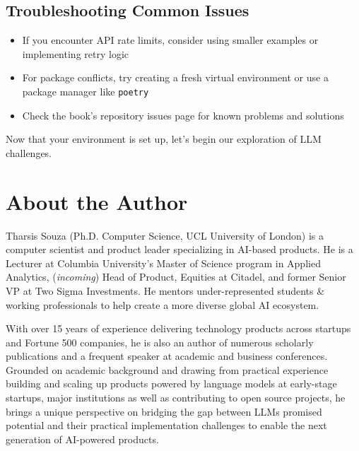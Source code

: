 \subsection{Troubleshooting Common Issues}
\begin{itemize}
    \item If you encounter API rate limits, consider using smaller examples or implementing retry logic
    \item For package conflicts, try creating a fresh virtual environment or use a package manager like \texttt{poetry}
    \item Check the book's repository issues page for known problems and solutions
\end{itemize}

Now that your environment is set up, let's begin our exploration of LLM challenges.

\section{About the Author}

Tharsis Souza (Ph.D. Computer Science, UCL University of London) is a computer scientist and product leader specializing in AI-based products. He is a Lecturer at Columbia University's Master of Science program in Applied Analytics, (\textit{incoming}) Head of Product, Equities at Citadel, and former Senior VP at Two Sigma Investments. He mentors under-represented students \& working professionals to help create a more diverse global AI ecosystem.

With over 15 years of experience delivering technology products across startups and Fortune 500 companies, he is also an author of numerous scholarly publications and a frequent speaker at academic and business conferences. Grounded on academic background and drawing from practical experience building and scaling up products powered by language models at early-stage startups, major institutions as well as contributing to open source projects, he brings a unique perspective on bridging the gap between LLMs promised potential and their practical implementation challenges to enable the next generation of AI-powered products.
